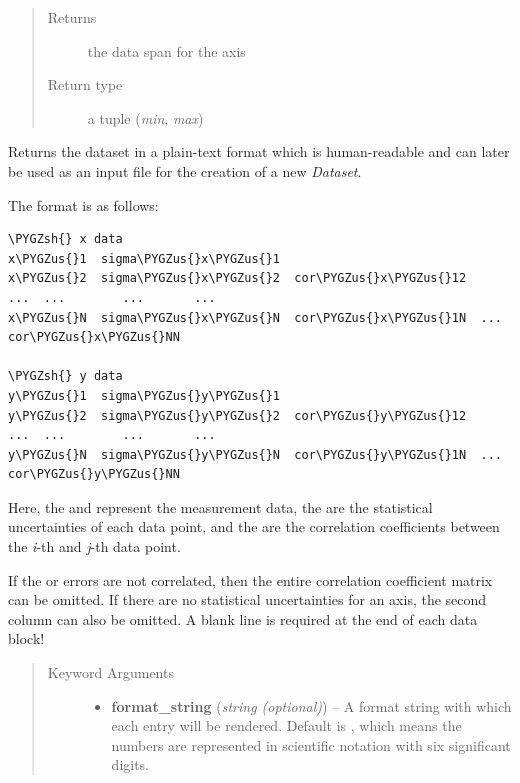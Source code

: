 \documentclass[a4paper,10pt,english]{sphinxmanual}
\def\PYGZus{\char`\_}
\def\PYGZsh{\char`\#}
\begin{document}
\begin{fulllineitems}
\begin{fulllineitems}
\begin{quote}
\begin{description}
\item[{Returns}] \leavevmode
the data span for the axis

\item[{Return type}] \leavevmode
a tuple (\emph{min}, \emph{max})

\end{description}\end{quote}

\end{fulllineitems}


\begin{fulllineitems}
\label{index:kafe.dataset.Dataset.get_formatted}
Returns the dataset in a plain-text format which is human-readable and
can later be used as an input file for the creation of a new \emph{Dataset}.

The format is as follows:

\begin{Verbatim}[commandchars=\\\{\}]
\PYGZsh{} x data
x\PYGZus{}1  sigma\PYGZus{}x\PYGZus{}1
x\PYGZus{}2  sigma\PYGZus{}x\PYGZus{}2  cor\PYGZus{}x\PYGZus{}12
...  ...        ...       ...
x\PYGZus{}N  sigma\PYGZus{}x\PYGZus{}N  cor\PYGZus{}x\PYGZus{}1N  ...  cor\PYGZus{}x\PYGZus{}NN

\PYGZsh{} y data
y\PYGZus{}1  sigma\PYGZus{}y\PYGZus{}1
y\PYGZus{}2  sigma\PYGZus{}y\PYGZus{}2  cor\PYGZus{}y\PYGZus{}12
...  ...        ...       ...
y\PYGZus{}N  sigma\PYGZus{}y\PYGZus{}N  cor\PYGZus{}y\PYGZus{}1N  ...  cor\PYGZus{}y\PYGZus{}NN
\end{Verbatim}

Here, the  and  represent the measurement data, the
 are the statistical uncertainties of each data point, and
the  are the correlation coefficients between the \emph{i}-th
and \emph{j}-th data point.

If the  or  errors are not correlated, then the entire
correlation coefficient matrix can be omitted. If there are no
statistical uncertainties for an axis, the second column can also be
omitted. A blank line is required at the end of each data block!
\begin{quote}\begin{description}
\item[{Keyword Arguments}] \leavevmode\begin{itemize}
\item {} 
\textbf{format\_string} (\emph{string (optional)}) --
A format string with which each entry will be rendered. Default is
, which means the numbers are represented in scientific
notation with six significant digits.


\end{itemize}
\end{description}
\end{quote}
\end{fulllineitems}
\end{fulllineitems}
\end{document}
